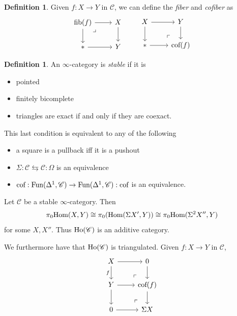 \documentclass[12pt]{amsart}
\theoremstyle{definition}
\newtheorem{definition}[theorem]{Definition}
\begin{document}
\begin{definition} Given $f: X \to Y$ in $\mathscr{C}$, we can define the \textit{fiber} and \textit{cofiber} as
\[ \begin{tikzcd}
    \fib(f)\dar\rar\pb & X\dar\\
    \ast\rar & Y
\end{tikzcd} \quad\quad \begin{tikzcd}
    X\rar\dar & Y\dar\\
    \ast\rar & \cof(f) \po
\end{tikzcd} \]
\end{definition}

\begin{definition} An $\infty$-category is \textit{stable} if it is
\begin{itemize}
    \item pointed
    \item finitely bicomplete
    \item triangles are exact if and only if they are coexact.
\end{itemize}
\end{definition}

This last condition is equivalent to any of the following
\begin{itemize}
    \item a square is a pullback iff it is a pushout
    \item $\Sigma: \mathscr{C} \leftrightarrows \mathscr{C}: \Omega$ is an equivalence
    \item $\text{cof}:\text{Fun}(\Delta^1,\mathscr{C}) \to \text{Fun}(\Delta^1,\mathscr{C}): \text{cof}$ is an equivalence.
\end{itemize}

Let $\mathscr{C}$ be a stable $\infty$-category. Then
\begin{align*}
    \pi_0\text{Hom}(X,Y) \cong \pi_0(\text{Hom}(\Sigma X', Y)) \cong \pi_0 \text{Hom}(\Sigma^2 X'',Y)
\end{align*}
for some $X,X''$. Thus $\text{Ho}(\mathscr{C})$ is an additive category.

We furthermore have that $\text{Ho}(\mathscr{C})$ is triangulated. Given $f: X \to Y$ in $\mathscr{C}$,
\[ \begin{tikzcd}
    X\rar\dar["f" left] & 0\dar\\
    Y\rar\dar & \cof(f)\po\dar\\
    0\rar & \Sigma X \po\\
\end{tikzcd} \]
\end{document}
